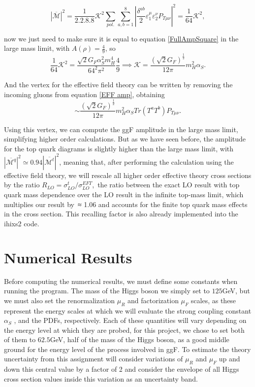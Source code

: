 \documentclass[EPJ,twocolumn]{webofc}
\begin{document}
\begin{equation}
    |\overline{\mathcal{M}}|^2 = \frac{1}{2.2.8.8}\mathcal{K}^2\sum_{pol.}\sum_{a,b=1}^8 \left|\frac{\delta^{ab}}{2}\varepsilon_1^{\mu}\varepsilon_2^{\nu} P_{T\mu\nu}\right|^2=\frac{1}{64}\mathcal{K}^2,
\end{equation}

now we just need to make sure it is equal to equation \ref{FullAmpSquare} in the large mass limit, with $A\left(\rho\right) = \frac{4}{9}$, so
\begin{equation}
    \frac{1}{64}\mathcal{K}^2 = \frac{\sqrt{2}G_F\alpha_S^2m_H^4}{64^2\pi^2}\frac{4}{9} \implies \mathcal{K}=\frac{ (\sqrt{2}G_F) ^{\frac{1}{2}} }{12\pi}m_H^2\alpha_S.
\end{equation}

And the vertex for the effective field theory can be written by removing the incoming gluons from equation \ref{EFF amp}, obtaining
\begin{equation}
    \sim \frac{ (\sqrt{2}G_F) ^{\frac{1}{2}} }{12\pi}m_H^2\alpha_S Tr\left(T^aT^b\right)P_{T\mu\nu}.
\end{equation}

Using this vertex, we can compute the ggF amplitude in the large mass limit, simplifying higher order calculations. But as we have seen before, the amplitude for the top quark diagrams is slightly higher than the large mass limit, with $|\overline{\mathcal{M}^{q}}|^2  \simeq 0.94|\overline{\mathcal{M}^t}|^2$, meaning that, after performing the calculation using the effective field theory, we will rescale all higher order effective theory cross sections by the ratio $R_{LO} = \sigma_{LO}^t /\sigma_{LO}^{EFT}$, the ratio between the exact LO result with top quark mass dependence over the LO result in the infinite top-mass limit, which multiplies our result by ≈ 1.06 and accounts for the finite top quark mass effects in the cross section. This recalling factor is also already implemented into the ihixs2 code. 

\section{\label{sec4}Numerical Results}

Before computing the numerical results,  we must define some constants when running the program. The mass of the Higgs boson we simply set to $125$GeV, but we must also set the renormalization $\mu_R$ and factorization $\mu_F$ scales, as these represent the energy scales at which we will evaluate the strong coupling constant $\alpha_S$ , and the PDFs, respectively. Each of these quantities will vary depending on the energy level at which they are probed, for this project, we chose to set both of them to $62.5$GeV, half of the mass of the Higgs boson, as a good middle ground for the energy level of the process involved in ggF.  To estimate the theory uncertainty from this assignment will consider variations of $\mu_R$ and $\mu_F$ up and down this central value by a factor of 2 and consider the envelope of all Higgs cross section values inside this variation as an uncertainty band.
\end{document}
